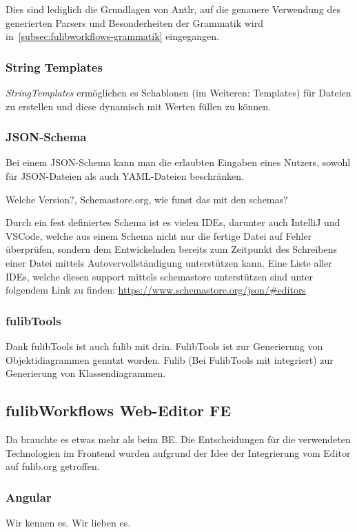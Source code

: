 Dies sind lediglich die Grundlagen von Antlr, auf die genauere Verwendung des generierten Parsers und Besonderheiten der Grammatik wird in~\ref{subsec:fulibworkflows-grammatik} eingegangen.

\subsubsection{String Templates}
\textit{StringTemplates} ermöglichen es Schablonen (im Weiteren: Templates) für Dateien zu erstellen und diese dynamisch mit Werten füllen zu können.


\subsubsection{JSON-Schema}\label{subsubsec:json-schema}
Bei einem JSON-Schema kann man die erlaubten Eingaben eines Nutzers, sowohl für JSON-Dateien als
auch YAML-Dateien beschränken.

\todo Welche Version?, Schemastore.org, wie funst das mit den schemas?

Durch ein fest definiertes Schema ist es vielen IDEs, darunter auch IntelliJ und VSCode, welche
aus einem Schema nicht nur die fertige Datei auf Fehler überprüfen, sondern dem Entwickelnden bereits
zum Zeitpunkt des Schreibens einer Datei mittels Autovervollständigung unterstützen kann.
Eine Liste aller IDEs, welche diesen support mittels schemastore unterstützen sind unter folgendem
Link zu finden: \url{https://www.schemastore.org/json/#editors}

\subsubsection{fulibTools}
\todo
Dank fulibTools ist auch fulib mit drin.
FulibTools ist zur Generierung von Objektidiagrammen genutzt worden.
Fulib (Bei FulibTools mit integriert) zur Generierung von Klassendiagrammen.

\subsection{fulibWorkflows Web-Editor FE}\label{subsec:fulibworkflows-web-editor}
\todo
Da brauchte es etwas mehr als beim BE\@.
Die Entscheidungen für die verwendeten Technologien im Frontend wurden aufgrund
der Idee der Integrierung vom Editor auf fulib.org getroffen.

\subsubsection{Angular}
\todo
Wir kennen es.
Wir lieben es.


